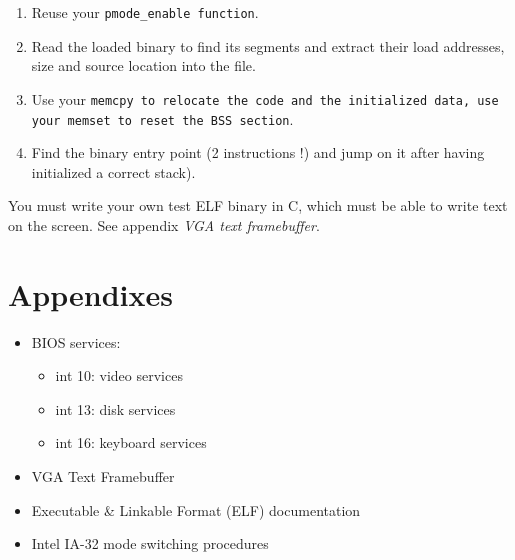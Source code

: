 \begin{itemize}
\begin{enumerate}
    \item {Reuse your \tt pmode\_enable \rm function}.

    \item {Read the loaded binary to find its segments and extract
    their load addresses, size and source location into the file}.

    \item {Use your \tt memcpy \rm to relocate the code and the
    initialized data, use your \tt memset \rm to reset the BSS section}.

    \item {Find the binary entry point (2 instructions !) and jump on
    it after having initialized a correct stack)}.

  \end{enumerate}

You must write your own test ELF binary in C, which must be able to
write text on the screen. See appendix \emph{VGA text framebuffer}.

\end{itemize}

\newpage

\section{Appendixes}

\begin{itemize}
\item
  BIOS services:
  \begin{itemize}
  \item
    int 10: video services
  \item
    int 13: disk services
  \item
    int 16: keyboard services
  \end{itemize}
\item
  VGA Text Framebuffer
\item
  Executable \& Linkable Format (ELF) documentation
\item
  Intel IA-32 mode switching procedures
\end{itemize}

%
%











